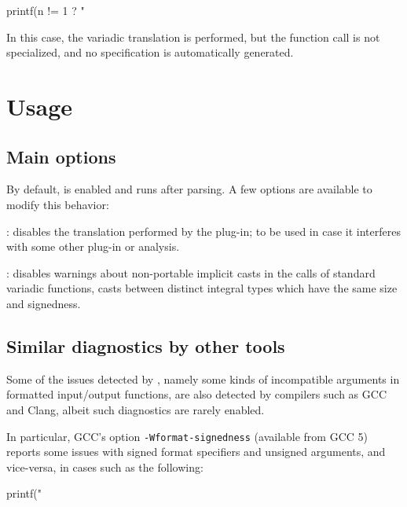 \begin{ccode}
  printf(n != 1 ? "%
\end{ccode}

In this case, the variadic translation is performed, but the function call
is not specialized, and no specification is automatically generated.

\section{Usage}

\subsection{Main options}

By default,  is enabled and runs after parsing.
A few options are available to modify this behavior:

\begin{description}

\item \texttt{} : disables the translation
  performed by the plug-in; to be used in case it interferes with some other
  plug-in or analysis.
\item \texttt{} : disables warnings about
  non-portable implicit casts in the calls of standard variadic functions,
  \ie casts between distinct integral types which have the same size and
  signedness.

\end{description}

\subsection{Similar diagnostics by other tools}

Some of the issues detected by , namely some kinds of
incompatible arguments in formatted input/output functions, are also detected
by compilers such as GCC and Clang, albeit such diagnostics are rarely enabled.

In particular, GCC's option \verb+-Wformat-signedness+ (available from GCC 5)
reports some issues with signed format specifiers and unsigned arguments, and
vice-versa, in cases such as the following:

\begin{ccode}
  printf("%
\end{ccode}


